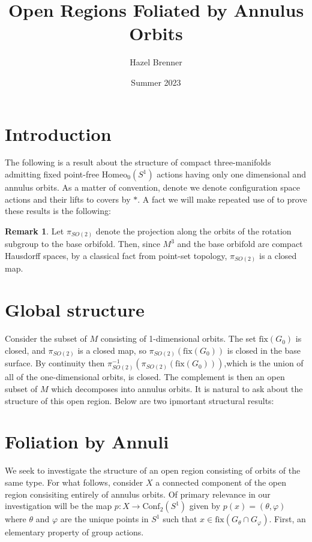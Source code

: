 \documentclass[10pt, oneside]{article}
\title{Open Regions Foliated by Annulus Orbits}
\author{Hazel Brenner}
\date{Summer 2023}
\newcommand{\homeoS}{\text{Homeo}_0(S^1)}
\theoremstyle{definition}
\newtheorem{rem}{Remark}
\theoremstyle{definition}
\begin{document}
\maketitle

\section{Introduction}
The following is a result about the structure of compact three-manifolds admitting fixed point-free $\homeoS$ actions having only one dimensional and annulus orbits. As a matter of convention, denote we denote configuration space actions and their lifts to covers by $*$. A fact we will make repeated use of to prove these results is the following:

\begin{rem}
    Let $\pi_{SO(2)}$ denote the projection along the orbits of the rotation subgroup to the base orbifold. Then, since $M^3$ and the base orbifold are compact Hausdorff spaces, by a classical fact from point-set topology, $\pi_{SO(2)}$ is a closed map.
\end{rem}

\section{Global structure}
Consider the subset of $M$ consisting of 1-dimensional orbits. The set $\text{fix}(G_0)$ is closed, and $\pi_{SO(2)}$ is a closed map, so $\pi_{SO(2)}(\text{fix}(G_0))$ is closed in the base surface. By continuity then $\pi_{SO(2)}^{-1}(\pi_{SO(2)}(\text{fix}(G_0)))$,which is the union of all of the one-dimensional orbits, is closed.
The complement is then an open subset of $M$ which decomposes into annulus orbits. It is natural to ask about the structure of this open region. Below are two ipmortant structural results:

\section{Foliation by Annuli}

We seek to investigate the structure of an open region consisting of orbits of the same type. For what follows, consider $X$ a connected component of the open region consisiting entirely of annulus orbits. Of primary relevance in our investigation will be the map $p: X\to \text{Conf}_2(S^1)$ given by $p(x) = (\theta, \varphi)$ where $\theta$ and $\varphi$ are the unique points in $S^1$ such that $x\in\text{fix}(G_\theta\cap G_\varphi)$. First, an elementary property of group actions.
\end{document}
